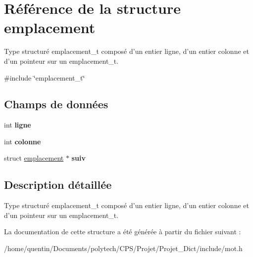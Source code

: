 \hypertarget{structemplacement}{\section{Référence de la structure emplacement}
\label{structemplacement}
}


Type structuré emplacement\-\_\-t composé d'un entier ligne, d'un entier colonne et d'un pointeur sur un emplacement\-\_\-t.  




{\ttfamily \#include \char`\"{}emplacement\-\_\-t\char`\"{}}

\subsection*{Champs de données}
\begin{DoxyCompactItemize}
\item 
\hypertarget{structemplacement_a66af32d3d7b5e0efd6db373c0813e7dd}{int {\bfseries ligne}}\label{structemplacement_a66af32d3d7b5e0efd6db373c0813e7dd}

\item 
\hypertarget{structemplacement_a733a251be89c7decb13f4fb7b413c82d}{int {\bfseries colonne}}\label{structemplacement_a733a251be89c7decb13f4fb7b413c82d}

\item 
\hypertarget{structemplacement_a207fde633d90a8e186edd5e06ec1d210}{struct \hyperlink{structemplacement}{emplacement} $\ast$ {\bfseries suiv}}\label{structemplacement_a207fde633d90a8e186edd5e06ec1d210}

\end{DoxyCompactItemize}


\subsection{Description détaillée}
Type structuré emplacement\-\_\-t composé d'un entier ligne, d'un entier colonne et d'un pointeur sur un emplacement\-\_\-t. 

La documentation de cette structure a été générée à partir du fichier suivant \-:\begin{DoxyCompactItemize}
\item 
/home/quentin/\-Documents/polytech/\-C\-P\-S/\-Projet/\-Projet\-\_\-\-Dict/include/mot.\-h\end{DoxyCompactItemize}
